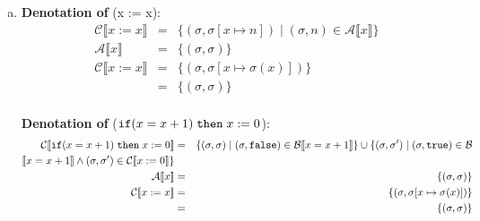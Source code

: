 \documentclass[10pt, oneside]{article}
\begin{document}
\begin{enumerate}[1.]
\begin{enumerate} [(a)]
\begin{eqnarray*}
        P(n+1): & & f_{n+1} = F(f_n) \\
                & = & \{(\sigma, \sigma'') 
    					    \mid (\sigma, \sigma') \in \mathcal{C} \llbracket c \rrbracket 
                \wedge (\sigma', \sigma'') \in f_n \}
      \end{eqnarray*}
      Using our inductive hypothesis, we can conclude that $f_n = \emptyset$ which
      in turn means that the second rule in the set comprehension (e.g. $(\sigma',
      \sigma'') \in f_n$) is unsatisfiable. So the right hand side of the equation
      is just the empty set, as desired:
      
      $$f_{n+1} = \emptyset \text{ } \checkmark$$ 
      
      Therefore, $P(n)$ hold for all $n \in \mathbb{N}$ and the fixed point of $F'$ 
      is:
      
      $$ \text{fix}(F') = \bigcup_{i \geq 0} F'^{i}(\emptyset) = \emptyset \cup 
      \emptyset \cup ... \cup \emptyset = \emptyset$$

      In short, $c_b$ is guaranteed not to terminate, just like $c_a$.
      
    \item {\bf Denotation of}  (x := x):
       \begin{eqnarray*}  \mathcal{C} \llbracket x := x \rrbracket & = & \{ (\sigma, \sigma[x \mapsto n]) \mid (\sigma, n) \in \mathcal{A} \llbracket x \rrbracket \} \\
    \mathcal{A} \llbracket x \rrbracket & = & \{ (\sigma, \sigma)\} \\
     \mathcal{C} \llbracket x := x \rrbracket & = & \{ (\sigma, \sigma[x \mapsto \sigma(x)]) \}\\
     & = & \{(\sigma, \sigma)\}\\
   \end{eqnarray*}
   
   
   {\bf Denotation of}   ($\texttt{if} (x = x+1) \hspace{1mm} \texttt{then} \hspace{1mm} x := 0$):
       \begin{eqnarray*}  \mathcal{C} \llbracket \texttt{if} (x = x+1) \hspace{1mm} \texttt{then}\hspace{1mm} x := 0 \rrbracket & = & \{ (\sigma, \sigma) \mid (\sigma, \texttt{false}) \in \mathcal{B} \llbracket x = x + 1 \rrbracket \} \cup \{ (\sigma, \sigma') \mid (\sigma, \texttt{true}) \in \mathcal{B}\\  \llbracket x = x + 1 \rrbracket \wedge (\sigma, \sigma') \in \mathcal{C}\llbracket x := 0 \rrbracket \} \\
    \mathcal{A} \llbracket x \rrbracket & = & \{ (\sigma, \sigma)\} \\
     \mathcal{C} \llbracket x := x \rrbracket & = & \{ (\sigma, \sigma[x \mapsto \sigma(x)]) \}\\
     & = & \{(\sigma, \sigma)\}
   \end{eqnarray*}
   

\end{enumerate}
\end{enumerate}
\end{document}
